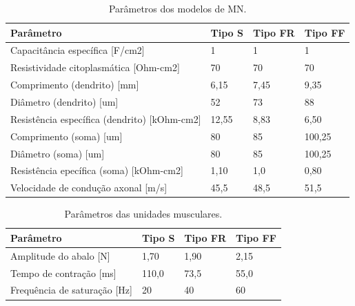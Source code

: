 \begin{table}[h]
 \caption{Parâmetros dos modelos de MN.}
  \centering
  \begin{tabularx}{\columnwidth}{Xlll}
    \toprule
    Parâmetro     & Tipo S     & Tipo FR     & Tipo FF   \\
    \midrule
    Capacitância específica [F/cm2] & 1 & 1 & 1    \\
    Resistividade citoplasmática [Ohm-cm2] & 70 & 70 & 70 \\
    Comprimento (dendrito) [mm] & 6,15 & 7,45 & 9,35 \\
    Diâmetro (dendrito) [um] & 52 & 73 & 88 \\
    Resistência específica (dendrito) [kOhm-cm2] & 12,55 & 8,83 & 6,50 \\
    Comprimento (soma) [um] & 80 & 85 & 100,25 \\
    Diâmetro (soma) [um] & 80 & 85 & 100,25 \\
    Resistência epecífica (soma) [kOhm-cm2] & 1,10 & 1,0 & 0,80 \\
    Velocidade de condução axonal [m/s] & 45,5 & 48,5 & 51,5 \\
    \bottomrule
  \end{tabularx}
  \label{tab:table1}
\end{table}


\begin{table}[h]
 \caption{Parâmetros das unidades musculares.}
  \centering
  \begin{tabular}{llll}
    \toprule
    Parâmetro     & Tipo S     & Tipo FR     & Tipo FF   \\
    \midrule
    Amplitude do abalo [N] & 1,70 & 1,90 & 2,15 \\
    Tempo de contração [ms] & 110,0 & 73,5 & 55,0 \\
    Frequência de saturação [Hz] & 20 & 40 & 60 \\
    \bottomrule
  \end{tabular}
  \label{tab:table2}
\end{table}

